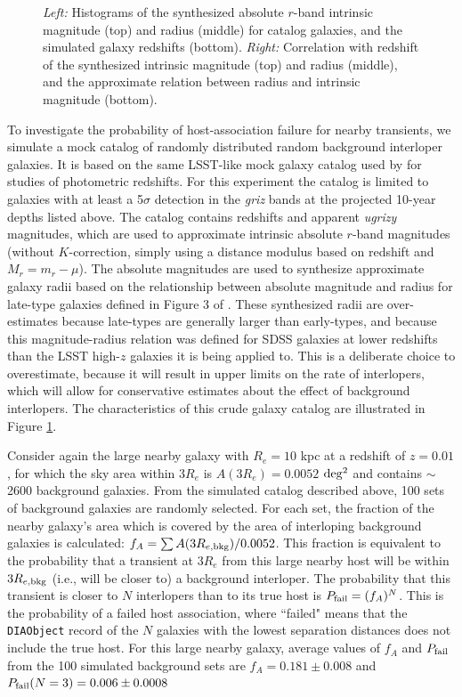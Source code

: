 \begin{figure}[h]
\begin{center}
\caption{{\it Left:} Histograms of the synthesized absolute $r$-band intrinsic magnitude (top) and radius (middle) for catalog galaxies, and the simulated galaxy redshifts (bottom). {\it Right:} Correlation with redshift of the synthesized intrinsic magnitude (top) and radius (middle), and the approximate relation between radius and intrinsic magnitude (bottom).  \label{fig:simcat}}
\end{center}
\end{figure}

To investigate the probability of host-association failure for nearby transients, we simulate a mock catalog of randomly distributed random background interloper galaxies.
It is based on the same LSST-like mock galaxy catalog used by \citet{2018AJ....155....1G} for studies of photometric redshifts.
For this experiment the catalog is limited to galaxies with at least a 5$\sigma$ detection in the {\it griz} bands at the projected 10-year depths listed above.
The catalog contains redshifts and apparent {\it ugrizy} magnitudes, which are used to approximate intrinsic absolute $r$-band magnitudes (without $K$-correction, simply using a distance modulus based on redshift and $M_r=m_r-\mu$).
The absolute magnitudes are used to synthesize approximate galaxy radii based on the relationship between absolute magnitude and radius for late-type galaxies defined in Figure 3 of \citet{2003MNRAS.343..978S}.
These synthesized radii are over-estimates because late-types are generally larger than early-types, and because this magnitude-radius relation was defined for SDSS galaxies at lower redshifts than the LSST high-$z$ galaxies it is being applied to.
This is a deliberate choice to overestimate, because it will result in upper limits on the rate of interlopers, which will allow for conservative estimates about the effect of background interlopers.
The characteristics of this crude galaxy catalog are illustrated in Figure \ref{fig:simcat}.

Consider again the large nearby galaxy with $R_e=10$ kpc at a redshift of $z=0.01$, for which the sky area within $3R_e$ is $A(3R_e)=0.0052$ $\rm deg^2$ and contains $\sim$2600 background galaxies.
From the simulated catalog described above, 100 sets of background galaxies are randomly selected.
For each set, the fraction of the nearby galaxy's area which is covered by the area of interloping background galaxies is calculated: $f_A = \sum{A(3R_{e,{\rm bkg}})} / 0.0052$.
This fraction is equivalent to the probability that a transient at $3R_e$ from this large nearby host will be within $3R_{e,{\rm bkg}}$ (i.e., will be closer to) a background interloper.
The probability that this transient is closer to $N$ interlopers than to its true host is $P_{\rm fail} = (f_A)^N$.
This is the probability of a failed host association, where ``failed" means that the {\tt DIAObject} record of the $N$ galaxies with the lowest separation distances does not include the true host.
For this large nearby galaxy, average values of $f_A$ and $P_{\rm fail}$ from the 100 simulated background sets are $f_A = 0.181\pm0.008$ and $P_{\rm fail} (N=3) = 0.006\pm0.0008$

